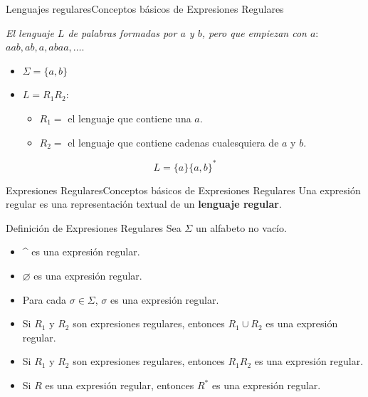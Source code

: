 \documentclass[spanish, handout]{beamer}
\begin{document}
\begin{frame}{Lenguajes regulares}{Conceptos básicos de Expresiones Regulares}

    \textit{El lenguaje $L$ de palabras formadas por $a$ y $b$, pero que empiezan con $a$}: $aab, ab, a, abaa, \dots$. \pause

    \begin{itemize}
        \itemsep1.25em
        \item $\Sigma = \{a, b\}$ \pause
        \item $L = R_1 R_2$: \pause
            \begin{itemize}
                \item $R_1 = $ el lenguaje que contiene una $a$. \pause
                \item $R_2 = $ el lenguaje que contiene cadenas cualesquiera de $a$ y $b$. \pause
            \end{itemize}
    \end{itemize}

    \[L = \{a\}\{a,b\}^* \]
\end{frame}

\begin{frame}{Expresiones Regulares}{Conceptos básicos de Expresiones Regulares}
    Una \alert{expresión regular} es una representación textual de un \textbf{lenguaje regular}. \pause

    \begin{block}{Definición de Expresiones Regulares}
        Sea $\Sigma$ un alfabeto no vacío. \pause

        \begin{itemize}
            \item \^{} es una expresión regular. \pause
            \item $\varnothing$ es una expresión regular. \pause
            \item Para cada $\sigma \in \Sigma$, $\sigma$ es una expresión regular. \pause
            \item Si $R_1$ y $R_2$ son expresiones regulares, entonces $R_1 \cup R_2$ es una expresión regular. \pause
            \item Si $R_1$ y $R_2$ son expresiones regulares, entonces $R_1 R_2$ es una expresión regular. \pause
            \item Si $R$ es una expresión regular, entonces $R^*$ es una expresión regular.
        \end{itemize}
    \end{block}
    
\end{frame}
\end{document}

